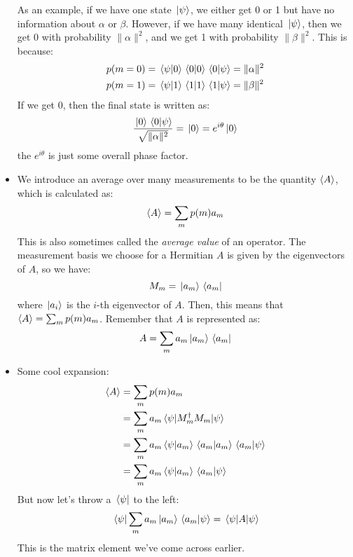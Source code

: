 \begin{itemize}
		As an example, if we have one state \( \ket*{\psi} \), we either get 0 or 1 but have no information about 
		\( \alpha \) or \( \beta \). However, if we have many identical \( \ket*{\psi} \), then we get 0 with 
		probability \( \|\alpha\|^2 \), and we get 1 with probability \( \|\beta\|^2 \). This is because:
		\begin{align*}
			p(m = 0) &= \braket*{\psi}{0}\braket*{0}{0}\braket*{0}{\psi} = \|\alpha\|^2\\
			p(m = 1) &= \braket*{\psi}{1}\braket*{1}{1}\braket*{1}{\psi} = \|\beta\|^2 
		\end{align*}
		If we get 0, then the final state is written as:
		\[
		\frac{\ket*{0}\braket*{0}{\psi}}{\sqrt{\|\alpha\|^2} } = \ket*{0} = e^{i\theta}\ket*{0}
		\] 
		the \( e^{i\theta} \) is just some overall phase factor. 
	\item We introduce an average over many measurements to be the quantity \( \langle A \rangle \), which is calculated
		as:
		\[
			\langle A \rangle = \sum_m p(m)a_m
		\] 
		This is also sometimes called the \textit{average value} of an operator. The measurement basis we 
		choose for a Hermitian \( A \) is given by the eigenvectors of \( A \), so we have: 
		\[
		M_m = \ket*{a_m}\bra*{a_m}
		\] 
		where \( \ket*{a_i} \) is the \( i \)-th eigenvector of \( A \). Then, this means that \( \langle A \rangle = 
		\sum_m p(m) a_m\). Remember that \( A \) is represented as: 
		\[
		A = \sum_m a_m \ket*{a_m}\bra*{a_m}
		\] 
	\item Some cool expansion: 
		\begin{align*}
			\langle A \rangle &= \sum_m p(m)a_{m}\\
					 &= \sum_m a_{m}\mel*{\psi}{M_m^{\dagger}M_m}{\psi} \\
					 &= \sum_m a_m \braket*{\psi}{a_m}\braket*{a_m}{a_m}\braket*{a_m}{\psi} \\
					 &= \sum_m a_m \braket*{\psi}{a_m}\braket*{a_m}{\psi} 
		\end{align*}
		But now let's throw a \( \bra*{\psi} \) to the left:
		\[
			\bra*{\psi}\sum_m a_m \ket*{a_m}\bra*{a_m}\ket*{\psi} = \mel*{\psi}{A}{\psi}
		\] 
		This is the matrix element we've come across earlier. 
 \end{itemize}
